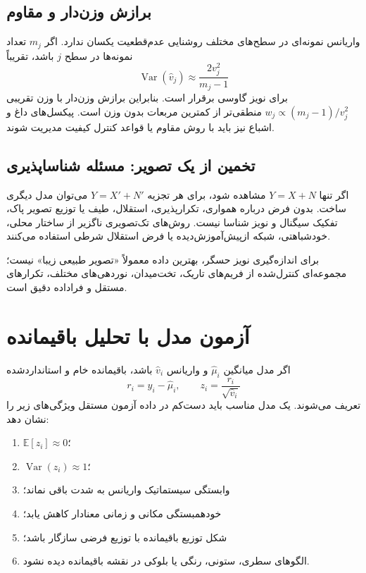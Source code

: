 \documentclass[12pt,openany,oneside]{book}
\newcommand{\E}{\mathbb{E}}
\newcommand{\Var}{\operatorname{Var}}
\begin{document}
\subsection{برازش وزن‌دار و مقاوم}

واریانس نمونه‌ای در سطح‌های مختلف روشنایی عدم‌قطعیت یکسان ندارد. اگر \(m_j\) تعداد نمونه‌ها در سطح \(j\) باشد،
تقریباً
\begin{equation}
\Var(\widehat v_j)\approx\frac{2v_j^2}{m_j-1}
\end{equation}
برای نویز گاوسی برقرار است. بنابراین برازش وزن‌دار با وزن تقریبی \(w_j\propto(m_j-1)/v_j^2\) منطقی‌تر از کمترین
مربعات بدون وزن است. پیکسل‌های داغ و اشباع نیز باید با روش مقاوم یا قواعد کنترل کیفیت مدیریت شوند.

\subsection{تخمین از یک تصویر: مسئله شناساپذیری}

اگر تنها \(Y=X+N\) مشاهده شود، برای هر تجزیه \(Y=X'+N'\) می‌توان مدل دیگری ساخت. بدون فرض درباره همواری،
تکرارپذیری، استقلال، طیف یا توزیع تصویر پاک، تفکیک سیگنال و نویز شناسا نیست. روش‌های تک‌تصویری ناگزیر از
ساختار محلی، خودشباهتی، شبکه ازپیش‌آموزش‌دیده یا فرض استقلال شرطی استفاده می‌کنند.

\begin{keybox}
برای اندازه‌گیری نویز حسگر، بهترین داده معمولاً «تصویر طبیعی زیبا» نیست؛ مجموعه‌ای کنترل‌شده از فریم‌های تاریک،
تخت‌میدان، نوردهی‌های مختلف، تکرارهای مستقل و فراداده دقیق است.
\end{keybox}

\section{آزمون مدل با تحلیل باقیمانده}

اگر مدل میانگین \(\widehat\mu_i\) و واریانس \(\widehat v_i\) باشد، باقیمانده خام و استانداردشده
\begin{equation}
r_i=y_i-\widehat\mu_i,
\qquad
z_i=\frac{r_i}{\sqrt{\widehat v_i}}
\end{equation}
تعریف می‌شوند. یک مدل مناسب باید دست‌کم در داده آزمون مستقل ویژگی‌های زیر را نشان دهد:
\begin{enumerate}
\item \(\E[z_i]\approx0\)؛
\item \(\Var(z_i)\approx1\)؛
\item وابستگی سیستماتیک واریانس به شدت باقی نماند؛
\item خودهمبستگی مکانی و زمانی معنادار کاهش یابد؛
\item شکل توزیع باقیمانده با توزیع فرضی سازگار باشد؛
\item الگوهای سطری، ستونی، رنگی یا بلوکی در نقشه باقیمانده دیده نشود.
\end{enumerate}
\end{document}
